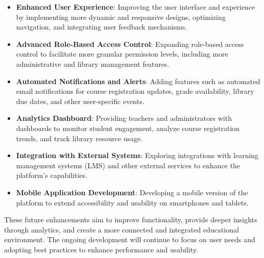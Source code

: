 \documentclass[12pt]{article}
\begin{document}
\begin{itemize}
    \item \textbf{Enhanced User Experience}: Improving the user interface and experience by implementing more dynamic and responsive designs, optimizing navigation, and integrating user feedback mechanisms.
    \item \textbf{Advanced Role-Based Access Control}: Expanding role-based access control to facilitate more granular permission levels, including more administrative and library management features.
    \item \textbf{Automated Notifications and Alerts}: Adding features such as automated email notifications for course registration updates, grade availability, library due dates, and other user-specific events.
    \item \textbf{Analytics Dashboard}: Providing teachers and administrators with dashboards to monitor student engagement, analyze course registration trends, and track library resource usage.
    \item \textbf{Integration with External Systems}: Exploring integrations with learning management systems (LMS) and other external services to enhance the platform's capabilities.
    \item \textbf{Mobile Application Development}: Developing a mobile version of the platform to extend accessibility and usability on smartphones and tablets.
\end{itemize}
These future enhancements aim to improve functionality, provide deeper insights through analytics, and create a more connected and integrated educational environment. The ongoing development will continue to focus on user needs and adopting best practices to enhance performance and usability.
\end{document}
